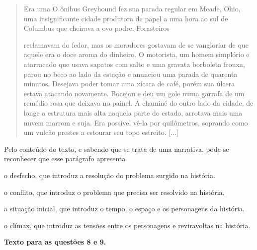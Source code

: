 \begin{quote}
Era uma O ônibus Greyhound fez sua parada regular em Meade, Ohio, uma
insignificante cidade produtora de papel a uma hora ao sul de Columbus
que cheirava a ovo podre. Forasteiros

reclamavam do fedor, mas os moradores gostavam de se vangloriar de que
aquele era o doce aroma do dinheiro. O motorista, um homem simplório e
atarracado que usava sapatos com salto e uma gravata borboleta frouxa,
parou no beco ao lado da estação e anunciou uma parada de quarenta
minutos. Desejava poder tomar uma xícara de café, porém sua úlcera
estava atacando novamente. Bocejou e deu um gole numa garrafa de um
remédio rosa que deixava no painel. A chaminé do outro lado da cidade,
de longe a estrutura mais alta naquela parte do estado, arrotava mais
uma nuvem marrom e suja. Era possível vê-la por quilômetros, soprando
como um vulcão prestes a estourar seu topo estreito.
{[}...{]}
\end{quote}


Pelo conteúdo do texto, e sabendo que se trata de uma narrativa, pode-se
reconhecer que esse parágrafo apresenta

\begin{escolha}
\item o desfecho, que introduz a resolução do problema surgido na história.

\item o conflito, que introduz o problema que precisa ser resolvido na
história.

\item a situação inicial, que introduz o tempo, o espaço e os personagens
da história.

\item o clímax, que introduz as tensões entre os personagens e reviravoltas
na história.
\end{escolha}

\textbf{Texto para as questões 8 e 9.}

